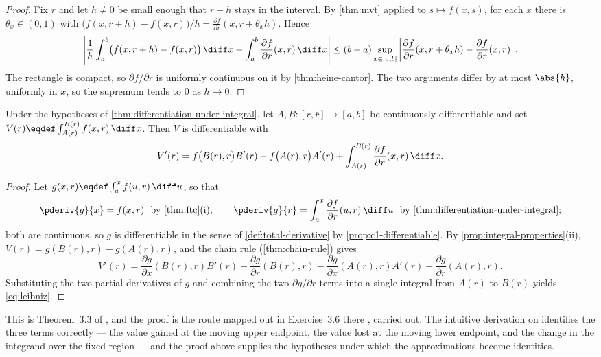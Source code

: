 \begin{proof}
	Fix $r$ and let $h\neq0$ be small enough that $r+h$ stays in the interval. By
	\autoref{thm:mvt} applied to $s\mapsto f(x,s)$, for each $x$ there is
	$\theta_x\in(0,1)$ with
	$\bigl(f(x,r+h)-f(x,r)\bigr)/h=\frac{\partial f}{\partial r}(x,r+\theta_xh)$.
	Hence
	\[
		\left|\frac{1}{h}\int_a^b\bigl(f(x,r+h)-f(x,r)\bigr)\,\diff x
		-\int_a^b\frac{\partial f}{\partial r}(x,r)\,\diff x\right|
		\leq(b-a)\sup_{x\in[a,b]}
		\left|\frac{\partial f}{\partial r}(x,r+\theta_xh)
		-\frac{\partial f}{\partial r}(x,r)\right| .
	\]
	The rectangle is compact, so $\partial f/\partial r$ is uniformly continuous on
	it by \autoref{thm:heine-cantor}. The two arguments differ by at most
	$\abs{h}$, uniformly in $x$, so the supremum tends to $0$ as $h\to0$.
\end{proof}

\begin{theorem}\label{thm:leibniz}
	Under the hypotheses of \autoref{thm:differentiation-under-integral}, let
	$A,B\colon[\underline r,\bar r]\to[a,b]$ be continuously differentiable and set
	$V(r)\eqdef\int_{A(r)}^{B(r)}f(x,r)\,\diff x$. Then $V$ is differentiable with
	\begin{equation}\label{eq:leibniz}
		V'(r)=f\bigl(B(r),r\bigr)B'(r)-f\bigl(A(r),r\bigr)A'(r)
		+\int_{A(r)}^{B(r)}\frac{\partial f}{\partial r}(x,r)\,\diff x .
	\end{equation}
\end{theorem}

\begin{proof}
	Let $g(x,r)\eqdef\int_a^xf(u,r)\,\diff u$, so that
	\[
		\pderiv{g}{x}=f(x,r)\ \text{ by \autoref{thm:ftc}(i)},
		\qquad
		\pderiv{g}{r}=\int_a^x\frac{\partial f}{\partial r}(u,r)\,\diff u
		\ \text{ by \autoref{thm:differentiation-under-integral}};
	\]
	both are continuous, so $g$ is
	differentiable in the sense of \autoref{def:total-derivative} by
	\autoref{prop:c1-differentiable}. By
	\autoref{prop:integral-properties}(ii), $V(r)=g(B(r),r)-g(A(r),r)$, and the
	chain rule (\autoref{thm:chain-rule}) gives
	\[
		V'(r)=\frac{\partial g}{\partial x}(B(r),r)B'(r)+\frac{\partial g}{\partial r}(B(r),r)
		-\frac{\partial g}{\partial x}(A(r),r)A'(r)-\frac{\partial g}{\partial r}(A(r),r).
	\]
	Substituting the two partial derivatives of $g$ and combining the two
	$\partial g/\partial r$ terms into a single integral from $A(r)$ to $B(r)$
	yields \eqref{eq:leibniz}.
\end{proof}

This is Theorem~3.3 of \textcite{fukuda2026notes}, and the proof is the route
mapped out in Exercise~3.6 there
\autocite[slides 95--96]{fukuda2026calculus}, carried out. The intuitive
derivation on \autocite[slides 97--98]{fukuda2026calculus} identifies the three
terms correctly --- the value gained at the moving upper endpoint, the value lost
at the moving lower endpoint, and the change in the integrand over the fixed
region --- and the proof above supplies the hypotheses under which the
approximations become identities.

